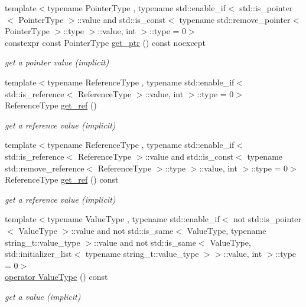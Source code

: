 \begin{DoxyCompactItemize}
{\footnotesize template$<$typename Pointer\+Type , typename std\+::enable\+\_\+if$<$ std\+::is\+\_\+pointer$<$ Pointer\+Type $>$\+::value and std\+::is\+\_\+const$<$ typename std\+::remove\+\_\+pointer$<$ Pointer\+Type $>$\+::type $>$\+::value, int $>$\+::type  = 0$>$ }\\constexpr const Pointer\+Type \hyperlink{classnlohmann_1_1basic__json_a9780ea9bb66b6191cb087b14396972c1}{get\+\_\+ptr} () const noexcept
\begin{DoxyCompactList}\small\item\em get a pointer value (implicit) \end{DoxyCompactList}\item 
{\footnotesize template$<$typename Reference\+Type , typename std\+::enable\+\_\+if$<$ std\+::is\+\_\+reference$<$ Reference\+Type $>$\+::value, int $>$\+::type  = 0$>$ }\\Reference\+Type \hyperlink{classnlohmann_1_1basic__json_a4f332e90f3cae562d0c3fa6ba48f74f9}{get\+\_\+ref} ()
\begin{DoxyCompactList}\small\item\em get a reference value (implicit) \end{DoxyCompactList}\item 
{\footnotesize template$<$typename Reference\+Type , typename std\+::enable\+\_\+if$<$ std\+::is\+\_\+reference$<$ Reference\+Type $>$\+::value and std\+::is\+\_\+const$<$ typename std\+::remove\+\_\+reference$<$ Reference\+Type $>$\+::type $>$\+::value, int $>$\+::type  = 0$>$ }\\Reference\+Type \hyperlink{classnlohmann_1_1basic__json_ab5386a09a24b341435172f43962a43f2}{get\+\_\+ref} () const
\begin{DoxyCompactList}\small\item\em get a reference value (implicit) \end{DoxyCompactList}\item 
{\footnotesize template$<$typename Value\+Type , typename std\+::enable\+\_\+if$<$ not std\+::is\+\_\+pointer$<$ Value\+Type $>$\+::value and not std\+::is\+\_\+same$<$ Value\+Type, typename string\+\_\+t\+::value\+\_\+type $>$\+::value and not std\+::is\+\_\+same$<$ Value\+Type, std\+::initializer\+\_\+list$<$ typename string\+\_\+t\+::value\+\_\+type $>$$>$\+::value, int $>$\+::type  = 0$>$ }\\\hyperlink{classnlohmann_1_1basic__json_ac5bed64638180098b5db82f8e482d855}{operator Value\+Type} () const
\begin{DoxyCompactList}\small\item\em get a value (implicit) \end{DoxyCompactList}\end{DoxyCompactItemize}
